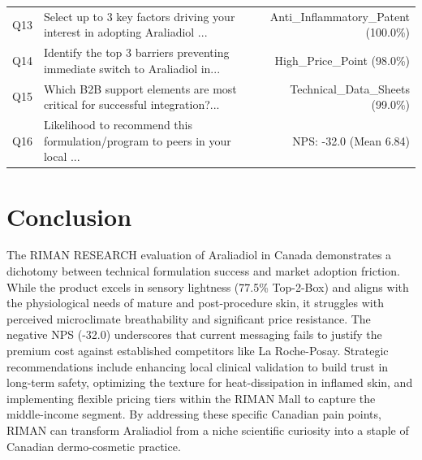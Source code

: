 \documentclass[10pt,twocolumn,a4paper]{article}
\begin{document}
\begin{table}[t]
\begin{tabularx}{\textwidth}{l X r}
Q13 & Select up to 3 key factors driving your interest in adopting Araliadiol ... & Anti\_Inflammatory\_Patent (100.0\%) \\
Q14 & Identify the top 3 barriers preventing immediate switch to Araliadiol in... & High\_Price\_Point (98.0\%) \\
Q15 & Which B2B support elements are most critical for successful integration?... & Technical\_Data\_Sheets (99.0\%) \\
Q16 & Likelihood to recommend this formulation/program to peers in your local ... & NPS: -32.0 (Mean 6.84) \\
\bottomrule
\end{tabularx}
\end{table}

\section{Conclusion}
The RIMAN RESEARCH evaluation of Araliadiol in Canada demonstrates a dichotomy between technical formulation success and market adoption friction. While the product excels in sensory lightness (77.5\% Top-2-Box) and aligns with the physiological needs of mature and post-procedure skin, it struggles with perceived microclimate breathability and significant price resistance. The negative NPS (-32.0) underscores that current messaging fails to justify the premium cost against established competitors like La Roche-Posay. Strategic recommendations include enhancing local clinical validation to build trust in long-term safety, optimizing the texture for heat-dissipation in inflamed skin, and implementing flexible pricing tiers within the RIMAN Mall to capture the middle-income segment. By addressing these specific Canadian pain points, RIMAN can transform Araliadiol from a niche scientific curiosity into a staple of Canadian dermo-cosmetic practice.
\end{document}
